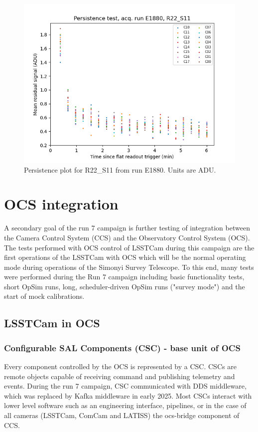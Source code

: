 \begin{figure}
    \centering
    \includegraphics[width=0.8\linewidth]{figures/ReferenceFigures/persistence_plot_LSSTCam_R22_S11_u_lsstccs_eo_persistence_E1880_w_2024_35_20241101T020526Z.png}
    \caption{Persistence plot for R22\_S11 from run E1880.  Units are ADU.}
    \label{fig:ref:persistence}
\end{figure}

\clearpage
\section{OCS integration}
A secondary goal of the run 7 campaign is further testing of integration between the Camera Control System (CCS) and the Observatory Control System (OCS). The tests performed with OCS control of LSSTCam during this campaign are the first operations of the LSSTCam with OCS which will be the normal operating mode during operations of the Simonyi Survey Telescope. To this end, many tests were performed during the Run 7 campaign including basic functionality tests, short OpSim runs, long, scheduler-driven OpSim runs ("survey mode") and the start of mock calibrations.

\subsection{LSSTCam in OCS}
\subsubsection{Configurable SAL Components (CSC) - base unit of OCS}

Every component controlled by the OCS is represented by a CSC. CSCs are remote objects capable of receiving command and publishing telemetry and events. During the run 7 campaign, CSC communicated with DDS middleware, which was replaced by Kafka middleware in early 2025. Most CSCs interact with lower level software such as an engineering interface, pipelines, or in the case of all cameras (LSSTCam, ComCam and LATISS) the ocs-bridge component of CCS.

